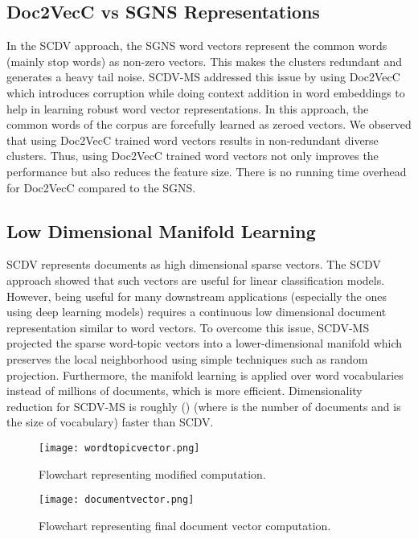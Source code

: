 \documentclass{ecai}
\newcommand{\method}{SCDV-MS}
\begin{document}
\subsection{Doc2VecC vs SGNS Representations}
\label{subsec:doc2vecC}
In the SCDV approach, the SGNS  word vectors represent the common words (mainly stop words) as non-zero vectors. This makes the clusters redundant and generates a heavy tail noise. \method{} addressed this issue by using Doc2VecC \cite{chen2017efficient} which introduces corruption while doing context addition in word embeddings to help in learning robust word vector representations. In this approach, the common words of the corpus are forcefully learned as zeroed vectors. We observed that using Doc2VecC trained word vectors results in non-redundant diverse clusters. Thus, using Doc2VecC trained word vectors not only improves the performance but also reduces the feature size. There is no running time overhead for Doc2VecC compared to the SGNS.

\subsection{Low Dimensional Manifold Learning}
\label{subsec:manifold}
SCDV \cite{mekala2017scdv} represents documents as high dimensional sparse vectors. The SCDV approach showed that such vectors are useful for linear classification models. However, being useful for many downstream applications (especially the ones using deep learning models) requires a continuous low dimensional document representation similar to word vectors. To overcome this issue, \method{} projected the sparse word-topic vectors into a lower-dimensional manifold which preserves the local neighborhood using simple techniques such as random projection. Furthermore, the manifold learning is applied over word vocabularies instead of millions of documents, which is more efficient. Dimensionality reduction for SCDV-MS is roughly () (where  is the number of documents and  is the size of vocabulary) faster than SCDV.

\begin{figure*}[!htb]
\captionsetup{font=small, skip=0.0pt}
  \texttt{[image: wordtopicvector.png]}
  \vspace{0.5 em}
  \caption{Flowchart representing modified  computation.}\label{figure:pipeline1}
\endminipage
\hfill
{}\captionsetup{font=small, skip=0pt}
  \texttt{[image: documentvector.png]}
  \vspace{0.5 em}
  \caption{Flowchart representing final document vector computation.}\label{figure:pipeline2}
\endminipage
\end{figure*}
\end{document}
